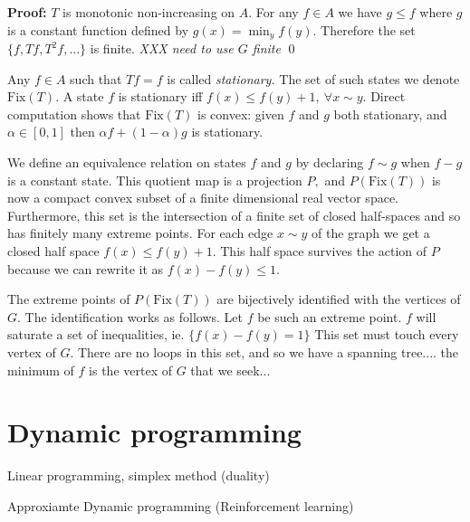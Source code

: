 \documentclass[12pt]{article}
\begin{document}
{\bf Proof:}
$T$ is monotonic non-increasing on $ A.$
For any $f\in A$ we have $g\le f$
where $g$ is a constant function defined by $g(x)=\min_y f(y).$
Therefore the set $\{f, Tf, T^2f,...\}$ is finite.
\emph{XXX need to use $G$ finite}
\qed


\def\Fix{\mathrm{Fix}}

Any $f\in  A$ such that $Tf=f$ is called \emph{stationary.}
The set of such states we denote $\Fix(T).$
A state $f$ is stationary iff
$f(x)\le f(y)+1,\ \forall x\sim y.$
Direct computation shows that
$\Fix(T)$ is convex:
given $f$ and $g$ both stationary,
and $\alpha\in[0, 1]$ then $\alpha f + (1-\alpha) g$
is stationary.

We define an equivalence relation on 
states $f$ and $g$ by 
declaring $f\sim g$ when $f-g$ is a constant state. 
This quotient map is a projection $P,$
and $P(\Fix(T))$ is now a compact convex subset of
a finite dimensional real vector space.
Furthermore, this set is the intersection
of a finite set of closed half-spaces and
so has finitely many extreme points.
For each edge $x\sim y$ of the graph
we get a closed half space
$f(x)\le f(y)+1.$
This half space survives the action of $P$
because we can rewrite it as $f(x)-f(y)\le 1.$

The extreme points of $P(\Fix(T))$ are bijectively
identified with the vertices of $G.$
The identification works as follows.
Let $f$ be such an extreme point.
$f$ will saturate a set of inequalities,
ie. $\{f(x)-f(y)=1\}$
This set must touch every vertex of $G.$
There are no loops in this set, and so we
have a spanning tree.... the minimum of $f$
is the vertex of $G$ that we seek...


\section{Dynamic programming}

Linear programming, simplex method (duality)

Approxiamte Dynamic programming (Reinforcement learning)
\end{document}
